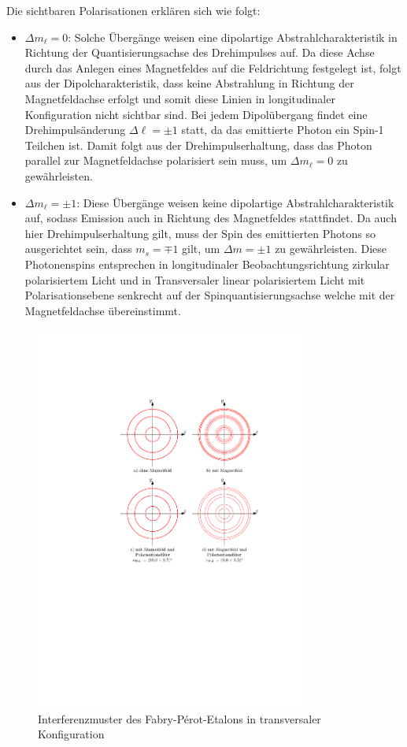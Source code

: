 \documentclass[11pt, a4paper]{article}
\begin{document}
Die sichtbaren Polarisationen erklären sich wie folgt:
\begin{itemize}
	\item $\Delta m_\ell = 0$: Solche Übergänge weisen eine dipolartige Abstrahlcharakteristik in Richtung der Quantisierungsachse des Drehimpulses auf.
	Da diese Achse durch das Anlegen eines Magnetfeldes auf die Feldrichtung festgelegt ist, folgt aus der Dipolcharakteristik, dass keine Abstrahlung in Richtung der Magnetfeldachse erfolgt und somit diese Linien in longitudinaler Konfiguration nicht sichtbar sind.
	Bei jedem Dipolübergang findet eine Drehimpulsänderung $\Delta \ell = \pm 1$ statt, da das emittierte Photon ein Spin-1 Teilchen ist.
	Damit folgt aus der Drehimpulserhaltung, dass das Photon parallel zur Magnetfeldachse polarisiert sein muss, um $\Delta m_\ell = 0$ zu gewährleisten.
	
	\item $\Delta m_\ell = \pm 1$: Diese Übergänge weisen keine dipolartige Abstrahlcharakteristik auf, sodass Emission auch in Richtung des Magnetfeldes stattfindet.
	Da auch hier Drehimpulserhaltung gilt, muss der Spin des emittierten Photons so ausgerichtet sein, dass $m_s = \mp 1$ gilt, um $\Delta m = \pm 1$ zu gewährleisten.
	Diese Photonenspins entsprechen in longitudinaler Beobachtungsrichtung zirkular polarisiertem Licht und in Transversaler linear polarisiertem Licht mit Polarisationsebene senkrecht auf der Spinquantisierungsachse welche mit der Magnetfeldachse übereinstimmt.
\end{itemize}


\begin{figure}[h]
	\centering
	\includegraphics[width=0.8\textwidth]{./figures/zeeman_transversal.pdf}
	\caption{Interferenzmuster des Fabry-Pérot-Etalons in transversaler Konfiguration}
	\label{fig:zeeman_transversal}
\end{figure}
\end{document}
